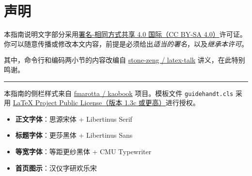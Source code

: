 \section{声明}
\label{sec:copyright}

\begin{widepar}
\begin{center}
  \vskip -1cm
  \faCreativeCommons\;
  \faCreativeCommonsBy\;
  \faCreativeCommonsSa
\end{center}

\bigskip

本指南说明文字部分采用\href{https://creativecommons.org/licenses/by-sa/4.0/deed.zh}{署名-相同方式共享 4.0 国际（CC BY-SA 4.0）}许可证。你可以随意传播或修改本文内容，前提是必须给出\emph{适当的署名}，以及\emph{继承本许可}。

\medskip

其中，命令行和编码两小节的内容改编自 \href{https://github.com/stone-zeng/latex-talk}{stone-zeng / latex-talk} 讲义，在此特别鸣谢。

\smallskip

\begin{center}
  \rule{10cm}{1pt}
\end{center}

\bigskip

本指南的侧栏样式来自 \href{https://github.com/fmarotta/kaobook}{fmarotta / kaobook} 项目。模板文件 \texttt{guidehandt.cls} 采用 \href{http://www.latex-project.org/lppl.txt}{LaTeX Project Public License（版本 1.3c 或更高）}进行授权。

\begin{itemize}
  \item \textbf{正文字体}：思源宋体 +  Libertinus Serif
  \item \textbf{标题字体}：更莎黑体 +  Libertinus Sans
  \item \textbf{等宽字体}：等距更纱黑体 + CMU Typewriter
  \item \textbf{首页图示}：汉仪字研欢乐宋
\end{itemize}

\end{widepar}

